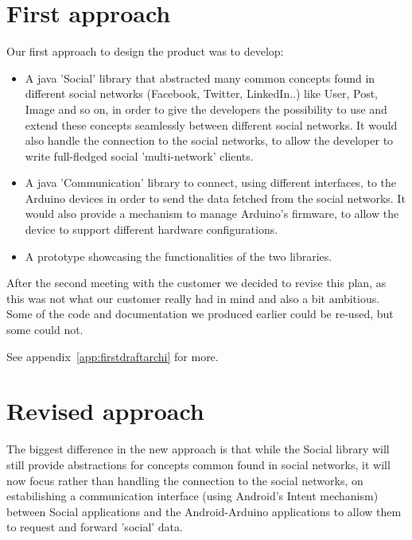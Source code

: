 
\section{First approach}
Our first approach to design the product was to develop:

\begin{itemize}
\item A java 'Social' library that abstracted many common concepts found in different
social networks (Facebook, Twitter, LinkedIn..) like User, Post, Image and so on,
in order to give the developers the possibility to use and extend these concepts seamlessly
between different social networks. It would also handle the connection to the social networks,
to allow the developer to write full-fledged social 'multi-network' clients.

\item A java 'Communication' library to connect, using different interfaces, to the Arduino devices
in order to send the data fetched from the social networks. It would also provide a mechanism to manage
Arduino's firmware, to allow the device to support different hardware configurations.

\item A prototype showcasing the functionalities of the two libraries.
\end{itemize}

After the second meeting with the customer we decided to revise this plan, as this was not what
our customer really had in mind and also a bit ambitious. Some of the code and documentation we produced
earlier could be re-used, but some could not.

See appendix~\ref{app:firstdraftarchi} for more.

\newpage
\section{Revised approach}
The biggest difference in the new approach is that while the Social library will still provide
abstractions for concepts common found in social networks, it will now focus rather than handling
the connection to the social networks, on estabilishing a communication interface (using Android's Intent mechanism)
between Social applications and the Android-Arduino applications to allow them to request and forward 'social' data.

